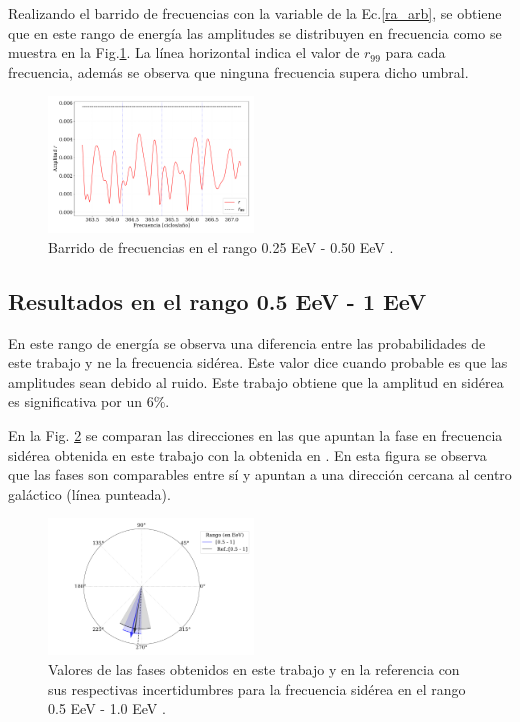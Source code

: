 Realizando el barrido de frecuencias con la variable de la Ec.\ref{ra_arb}, se obtiene que en este rango de energía las amplitudes se  distribuyen en frecuencia como se muestra en la Fig.\ref{fig:primer_barrido}. La línea horizontal indica el valor de $r_{99}$ para cada frecuencia, además se observa que ninguna frecuencia supera dicho umbral.
\begin{figure}[H]
    \begin{small}
        \begin{center}
            \includegraphics[width=0.485\textwidth]{plot_bin_1_barrido_v2.pdf}
        \end{center}
        \caption{Barrido de frecuencias en el  rango 0.25 EeV - 0.50 EeV .}
        \label{fig:primer_barrido}
    \end{small}
\end{figure}

\subsection*{Resultados en el rango 0.5 EeV - 1 EeV}
En este rango de energía se observa una diferencia entre las probabilidades de este trabajo y \cite{Aab_2020}  ne la frecuencia sidérea. Este valor dice cuando probable es que las amplitudes sean debido al ruido. Este trabajo obtiene que la amplitud en sidérea es significativa por un  $6\%$.  

En la Fig. \ref{fig:segundo} se comparan las direcciones en las que apuntan la fase en frecuencia sidérea obtenida en este trabajo con la obtenida en \cite{Aab_2020}. En esta figura se observa que las fases son comparables entre sí y apuntan a una dirección cercana al centro galáctico (línea punteada).

\begin{figure}[H]
    \begin{small}
        \begin{center}
            \includegraphics[width=0.485\textwidth]{phase_segundo_bin.pdf}
        \end{center}
        \caption{Valores de las fases obtenidos en este trabajo y en la referencia con sus respectivas incertidumbres para la frecuencia sidérea en el  rango 0.5 EeV - 1.0 EeV .}
        \label{fig:segundo}
    \end{small}
\end{figure}

